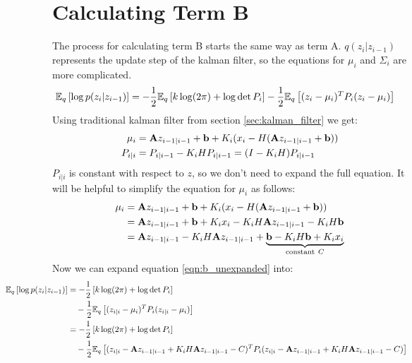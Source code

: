 \documentclass[12pt]{article}
\begin{document}
\section{Calculating Term B}
The process for calculating term B starts the same way as term A. $q(z_i|z_{i-1})$ represents the update step of the kalman filter, so the equations for $\mu_i$ and $\Sigma_i$ are more complicated.
\begin{align}
    \mathbb{E}_q \left[ \log p(z_i|z_{i-1})\right] &= -\frac{1}{2} \mathbb{E}_q \left[ k \log (2\pi) + \log \det P_i \right] - \frac{1}{2} \mathbb{E}_q \left[ (z_i - \mu_i)^T P_i (z_i - \mu_i) \right] \label{eqn:b_unexpanded}
\end{align}
Using traditional kalman filter from section \ref{sec:kalman_filter} we get:
\begin{align}
    \mu_i & = \mathbf{A} z_{i-1|i-1} + \mathbf{b} + K_i (x_i - H(\mathbf{A} z_{i-1|i-1} + \mathbf{b})) \\
    P_{i|i} &= P_{i|i-1} - K_i H P_{i|i-1} = (I-K_iH) P_{i|i-1}
\end{align}
$P_{i|i}$ is constant with respect to $z$, so we don't need to expand the full equation.
It will be helpful to simplify the equation for $\mu_i$ as follows:
\begin{align}
    \mu_i & = \mathbf{A} z_{i-1|i-1} + \mathbf{b} + K_i (x_i - H(\mathbf{A} z_{i-1|i-1} + \mathbf{b})) \\
    &= \mathbf{A} z_{i-1|i-1} + \mathbf{b} + K_i x_i - K_i H \mathbf{A} z_{i-1|i-1} - K_i H \mathbf{b} \\ 
    &= \mathbf{A} z_{i-1|i-1} - K_i H \mathbf{A} z_{i-1|i-1} + \underbrace{\mathbf{b} - K_i H \mathbf{b} + K_i x_i}_{\text{constant} \ C}
\end{align}
Now we can expand equation \ref{eqn:b_unexpanded} into:
\begin{align}
    \hspace*{-2cm} \E_q \left[ \log p(z_i|z_{i-1})\right] &= -\frac{1}{2} \left[ k \log (2\pi) + \log \det P_i \right] \nonumber \\
    &\quad - \frac{1}{2} \E_q \left[ (z_{i|i} - \mu_i)^T P_i (z_{i|i} - \mu_i) \right] \\
    &= -\frac{1}{2} \left[ k \log (2\pi) + \log \det P_i \right] \nonumber \\
    &\quad - \frac{1}{2} \E_q \left[ (z_{i|i} - \mA z_{i-1|i-1} + K_i H \mA z_{i-1|i-1} - C)^T P_i (z_{i|i} - \mA z_{i-1|i-1} + K_i H \mA z_{i-1|i-1} - C) \right] \\
\end{align}
\end{document}
